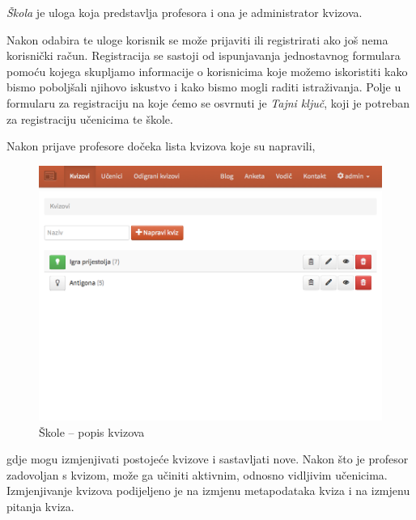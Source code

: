 \documentclass{scrreprt}
\begin{document}
\emph{Škola} je uloga koja predstavlja profesora i ona je administrator kvizova.

Nakon odabira te uloge korisnik se može prijaviti ili registrirati ako još nema
korisnički račun. Registracija se sastoji od ispunjavanja jednostavnog formulara
pomoću kojega skupljamo informacije o korisnicima koje možemo iskoristiti kako
bismo poboljšali njihovo iskustvo i kako bismo mogli raditi istraživanja. Polje
u formularu za registraciju na koje ćemo se osvrnuti je \emph{Tajni ključ}, koji
je potreban za registraciju učenicima te škole.

Nakon prijave profesore dočeka lista kvizova koje su napravili,

\begin{figure}[H]
  \includegraphics[width=\textwidth, clip=true, trim=0 10cm 0 0, fbox]{school/quizzes}
  \caption{Škole -- popis kvizova}
\end{figure}

gdje mogu izmjenjivati postojeće kvizove i sastavljati nove. Nakon što je
profesor zadovoljan s kvizom, može ga učiniti aktivnim, odnosno vidljivim
učenicima. Izmjenjivanje kvizova podijeljeno je na izmjenu metapodataka kviza i
na izmjenu pitanja kviza.
\end{document}
